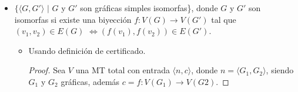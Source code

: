 \documentclass[letterpaper,10pt]{article}
\begin{document}
\begin{enumerate}
\begin{itemize}
\begin{itemize}
            \begin{proof}
         		Sea $N$ una MT no determinista con entrada $\langle s,s' \rangle$.\\
         		
         		$N$ hace los siguiente:
                
         		\begin{enumerate}[1)]
                    
         			\item Define $a=|s|$ y a $b=|s'|$.
         			
         			\item Toma $a$ números al azar en $\mathbb{Z}$ y los guarda en el conjunto $S_1$
         			
         			\item  Toma $b$ números al azar en $\mathbb{Z}$ y los guarda en el conjunto $S_2$
         			
         			\item Corre $V$ con entrada $\langle \langle s_1,s_2 \rangle ,c\rangle$ y si $V$ acepta $N$ devuelve true, en otro caso devuelve false.
         			
         		\end{enumerate}
         		
                Como dimos una MT no determinista que decide a $A$ en tiempo
                $O(n^2)$, llegamos a que $A\in NP$.
         	
            \end{proof}
         	
         \end{itemize}
        
         \item $\{\langle G, G' \rangle$ $|$ $G$ y $G'$ son gráficas simples
         isomorfas\}, donde $G$ y $G'$ son isomorfas si existe una biyección
         $f: V(G) \rightarrow V(G')$ tal que $(v_1, v_2) \in E(G)$ 
         $\Longleftrightarrow (f(v_1), f(v_2)) \in E(G')$.
         
         \begin{itemize}
         	
             \item Usando definición de certificado.
         	
            \begin{proof}
         		Sea $V$ una MT total con entrada $\langle n,c \rangle$, donde $n=\langle G_1,G_2 \rangle$, siendo $G_1$ y $G_2$ gráficas, además $c=f:V(G_1)\to V(G2)$. 
         		

\end{proof}
\end{itemize}
\end{itemize}
\end{enumerate}
\end{document}
